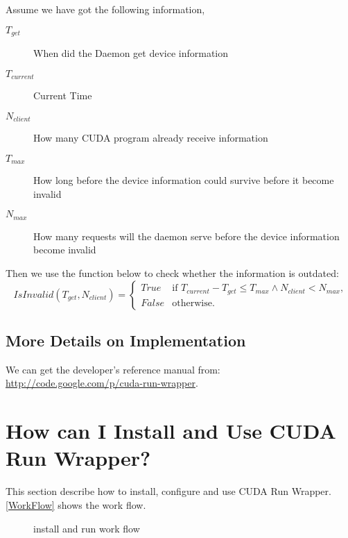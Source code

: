 \documentclass[a4paper,11pt]{article}
\begin{document}
Assume we have got the following information,
\begin{description}
  \item[$T_{get}$] When did the Daemon get device information
  \item[$T_{current}$] Current Time
  \item[$N_{client}$] How many CUDA program already receive information
  \item[$T_{max}$] How long before the device information could survive before it become invalid
  \item[$N_{max}$] How many requests will the daemon serve before the device information become invalid
\end{description}
Then we use the function below to check whether the information is outdated:
\[ IsInvalid(T_{get}, N_{client}) = \begin{cases}
  True & \text{if $T_{current}-T_{get} \le T_{max} \land N_{client} < N_{max}$,} \\
  False &\text{otherwise.}
\end{cases}
\]

\subsection{More Details on Implementation}
We can get the developer's reference manual from: \\
\href{http://code.google.com/p/cuda-run-wrapper"}{http://code.google.com/p/cuda-run-wrapper}.
\section{How can I Install and Use CUDA Run Wrapper?}
This section describe how to install, configure and use CUDA Run Wrapper.
\autoref{WorkFlow} shows the work flow.
\begin{figure}[h]
  \centering
{}
  \caption{install and run work flow}
  \label{WorkFlow}
\end{figure}
\end{document}
